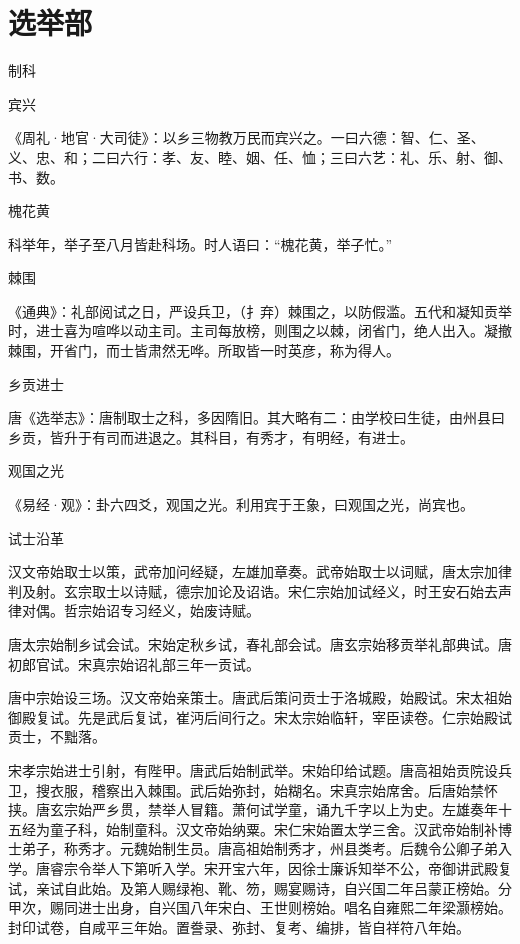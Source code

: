 \documentclass[a4paper,12pt,UTF8,twoside]{ctexbook}
\begin{document}
    \part{选举部}
    
    制科
    
    宾兴
    
    《周礼·地官·大司徒》：以乡三物教万民而宾兴之。一曰六德：智、仁、圣、义、忠、和；二曰六行：孝、友、睦、姻、任、恤；三曰六艺：礼、乐、射、御、书、数。
    
    槐花黄
    
    科举年，举子至八月皆赴科场。时人语曰：“槐花黄，举子忙。”
    
    棘围
    
    《通典》：礼部阅试之日，严设兵卫，（扌弃）棘围之，以防假滥。五代和凝知贡举时，进士喜为喧哗以动主司。主司每放榜，则围之以棘，闭省门，绝人出入。凝撤棘围，开省门，而士皆肃然无哗。所取皆一时英彦，称为得人。
    
    乡贡进士
    
    唐《选举志》：唐制取士之科，多因隋旧。其大略有二：由学校曰生徒，由州县曰乡贡，皆升于有司而进退之。其科目，有秀才，有明经，有进士。
    
    观国之光
    
    《易经·观》：卦六四爻，观国之光。利用宾于王象，曰观国之光，尚宾也。
    
    试士沿革
    
    汉文帝始取士以策，武帝加问经疑，左雄加章奏。武帝始取士以词赋，唐太宗加律判及射。玄宗取士以诗赋，德宗加论及诏诰。宋仁宗始加试经义，时王安石始去声律对偶。哲宗始诏专习经义，始废诗赋。
    
    唐太宗始制乡试会试。宋始定秋乡试，春礼部会试。唐玄宗始移贡举礼部典试。唐初郎官试。宋真宗始诏礼部三年一贡试。
    
    唐中宗始设三场。汉文帝始亲策士。唐武后策问贡士于洛城殿，始殿试。宋太祖始御殿复试。先是武后复试，崔沔后间行之。宋太宗始临轩，宰臣读卷。仁宗始殿试贡士，不黜落。
    
    宋孝宗始进士引射，有陛甲。唐武后始制武举。宋始印给试题。唐高祖始贡院设兵卫，搜衣服，稽察出入棘围。武后始弥封，始糊名。宋真宗始席舍。后唐始禁怀挟。唐玄宗始严乡贯，禁举人冒籍。萧何试学童，诵九千字以上为史。左雄奏年十五经为童子科，始制童科。汉文帝始纳粟。宋仁宋始置太学三舍。汉武帝始制补博士弟子，称秀才。元魏始制生员。唐高祖始制秀才，州县类考。后魏令公卿子弟入学。唐睿宗令举人下第听入学。宋开宝六年，因徐士廉诉知举不公，帝御讲武殿复试，亲试自此始。及第人赐绿袍、靴、笏，赐宴赐诗，自兴国二年吕蒙正榜始。分甲次，赐同进士出身，自兴国八年宋白、王世则榜始。唱名自雍熙二年梁灏榜始。封印试卷，自咸平三年始。置誊录、弥封、复考、编排，皆自祥符八年始。
    
\end{document}
